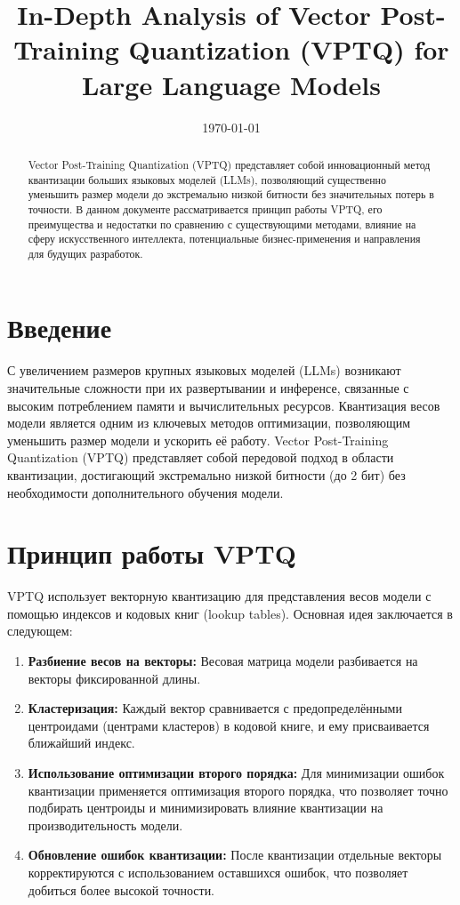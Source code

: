 \documentclass{article}
\title{In-Depth Analysis of Vector Post-Training Quantization (VPTQ) for Large Language Models}
\date{\today}
\begin{document}
\maketitle

\begin{abstract}
Vector Post-Training Quantization (VPTQ) представляет собой инновационный метод квантизации больших языковых моделей (LLMs), позволяющий существенно уменьшить размер модели до экстремально низкой битности без значительных потерь в точности. В данном документе рассматривается принцип работы VPTQ, его преимущества и недостатки по сравнению с существующими методами, влияние на сферу искусственного интеллекта, потенциальные бизнес-применения и направления для будущих разработок.
\end{abstract}

\section{Введение}
С увеличением размеров крупных языковых моделей (LLMs) возникают значительные сложности при их развертывании и инференсе, связанные с высоким потреблением памяти и вычислительных ресурсов. Квантизация весов модели является одним из ключевых методов оптимизации, позволяющим уменьшить размер модели и ускорить её работу. Vector Post-Training Quantization (VPTQ) представляет собой передовой подход в области квантизации, достигающий экстремально низкой битности (до 2 бит) без необходимости дополнительного обучения модели.

\section{Принцип работы VPTQ}
VPTQ использует векторную квантизацию для представления весов модели с помощью индексов и кодовых книг (lookup tables). Основная идея заключается в следующем:
\begin{enumerate}
    \item \textbf{Разбиение весов на векторы:} Весовая матрица модели разбивается на векторы фиксированной длины.
    \item \textbf{Кластеризация:} Каждый вектор сравнивается с предопределёнными центроидами (центрами кластеров) в кодовой книге, и ему присваивается ближайший индекс.
    \item \textbf{Использование оптимизации второго порядка:} Для минимизации ошибок квантизации применяется оптимизация второго порядка, что позволяет точно подбирать центроиды и минимизировать влияние квантизации на производительность модели.
    \item \textbf{Обновление ошибок квантизации:} После квантизации отдельные векторы корректируются с использованием оставшихся ошибок, что позволяет добиться более высокой точности.
\end{enumerate}
\end{document}
